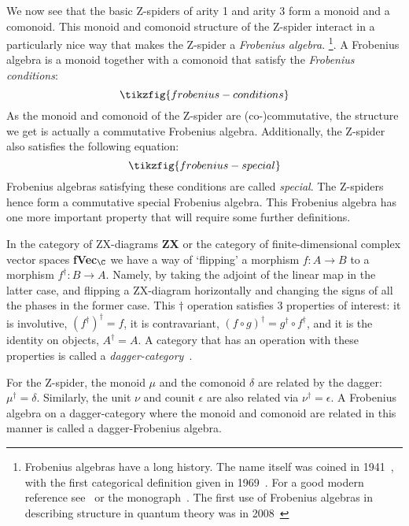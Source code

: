 \documentclass[a4paper,onecolumn,superscriptaddress,11pt,%
				unpublished,%
				allowfontchageintitle,%
				]{quantumarticle}
\begin{document}
We now see that the basic Z-spiders of arity 1 and arity 3 form a monoid and a comonoid. This monoid and comonoid structure of the Z-spider interact in a particularly nice way that makes the Z-spider a \emph{Frobenius algebra}.%
\footnote{Frobenius algebras have a long history. The name itself was coined in 1941~\cite{nakayama1941frobeniusean}, with the first categorical definition given in 1969~\cite{lawvere1969ordinal}. For a good modern reference see~\cite{street2004frobenius} or the monograph~\cite{kock2004frobenius}. The first use of Frobenius algebras in describing structure in quantum theory was in 2008~\cite{coecke2008measurements}
}.
A Frobenius algebra is a monoid together with a comonoid that satisfy the \emph{Frobenius conditions}:
\begin{equation}
	\tikzfig{frobenius-conditions}
\end{equation}
As the monoid and comonoid of the Z-spider are (co-)commutative, the structure we get is actually a commutative Frobenius algebra. 
Additionally, the Z-spider also satisfies the following equation:
\begin{equation}
	\tikzfig{frobenius-special}
\end{equation}
Frobenius algebras satisfying these conditions are called \emph{special}.
The Z-spiders hence form a commutative special Frobenius algebra. This Frobenius algebra has one more important property that will require some further definitions.

In the category of ZX-diagrams \textbf{ZX} or the category of finite-dimensional complex vector spaces \textbf{fVec}$_\C$ we have a way of `flipping' a morphism $f:A\rightarrow B$ to a morphism $f^\dagger:B\rightarrow A$. Namely, by taking the adjoint of the linear map in the latter case, and flipping a ZX-diagram horizontally and changing the signs of all the phases in the former case. This $\dagger$ operation satisfies 3 properties of interest: it is involutive, $(f^\dagger)^\dagger = f$, it is contravariant, $(f\circ g)^\dagger = g^\dagger\circ f^\dagger$, and it is the identity on objects, $A^\dagger = A$. A category that has an operation with these properties is called a \emph{dagger-category}~\cite{selinger2007dagger}.

For the Z-spider, the monoid $\mu$ and the comonoid $\delta$ are related by the dagger: $\mu^\dagger = \delta$. Similarly, the unit $\nu$ and counit $\epsilon$ are also related via $\nu^\dagger = \epsilon$. A Frobenius algebra on a dagger-category where the monoid and comonoid are related in this manner is called a dagger-Frobenius algebra.
\end{document}
